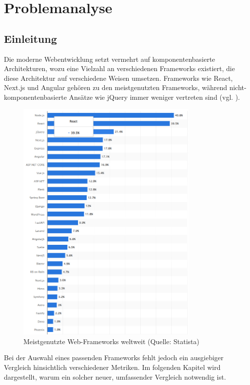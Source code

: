 \documentclass[oneside]{ausarbeitung}
\begin{document}
\chapter{Problemanalyse}
\label{cha:problemanalyse}

\section{Einleitung}
Die moderne Webentwicklung setzt vermehrt auf komponentenbasierte Architekturen, wozu eine Vielzahl an verschiedenen Frameworks existiert, die diese Architektur auf verschiedene Weisen umsetzen. Frameworks wie React, Next.js und Angular gehören zu den meistgenutzten Frameworks, während nicht-komponentenbasierte Ansätze wie jQuery immer weniger vertreten sind (vgl. \parencite{statista2024}).
\begin{figure}[h]
    \centering
    \includegraphics[width=0.8\textwidth, height=0.5\textheight, keepaspectratio]{images/web-frameworks.png}
    \caption{Meistgenutzte Web-Frameworks weltweit (Quelle: Statista)}
    \label{fig:frameworks}
\end{figure}

Bei der Auswahl eines passenden Frameworks fehlt jedoch ein ausgiebiger Vergleich hinsichtlich verschiedener Metriken. Im folgenden Kapitel wird dargestellt, warum ein solcher neuer, umfassender Vergleich notwendig ist.
\end{document}
